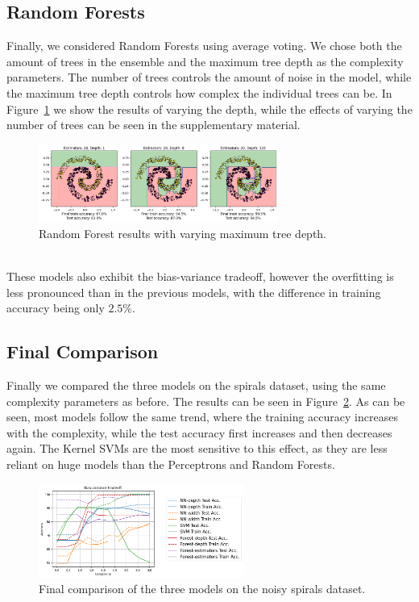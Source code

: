 \documentclass[11pt]{article}
\begin{document}
\subsection{Random Forests}
Finally, we considered Random Forests using average voting. We chose both the amount of trees in the ensemble and the maximum tree depth as the complexity parameters. The number of trees controls the amount of noise in the model, while the maximum tree depth controls how complex the individual trees can be. In Figure~\ref{fig:random_forest_results} we show the results of varying the depth, while the effects of varying the number of trees can be seen in the supplementary material.
\begin{figure}[h]
    \centering
    \includegraphics[width=0.7\textwidth]{img/forest-depth-result.png}
    \caption{Random Forest results with varying maximum tree depth.}
    \label{fig:random_forest_results}
\end{figure}\\
These models also exhibit the bias-variance tradeoff, however the overfitting is less pronounced than in the previous models, with the difference in training accuracy being only $2.5\%$.

\subsection{Final Comparison}
Finally we compared the three models on the spirals dataset, using the same complexity parameters as before. The results can be seen in Figure~\ref{fig:final_comparison}. As can be seen, most models follow the same trend, where the training accuracy increases with the complexity, while the test accuracy first increases and then decreases again. The Kernel SVMs are the most sensitive to this effect, as they are less reliant on huge models than the Perceptrons and Random Forests.
\begin{figure}[h]
    \centering
    \includegraphics[width=0.6\textwidth]{img/final-result.png}
    \caption{Final comparison of the three models on the noisy spirals dataset.}
    \label{fig:final_comparison}
\end{figure}
\end{document}
